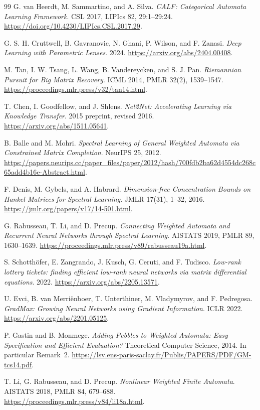 \documentclass[11pt]{article}
\theoremstyle{definition}
\theoremstyle{remark}
\begin{document}
\begin{thebibliography}{99}
G. van Heerdt, M. Sammartino, and A. Silva.
\emph{CALF: Categorical Automata Learning Framework}. CSL 2017,
LIPIcs 82, 29:1--29:24.
\url{https://doi.org/10.4230/LIPIcs.CSL.2017.29}.

G. S. H. Cruttwell, B. Gavranovic, N. Ghani, P. Wilson, and F. Zanasi.
\emph{Deep Learning with Parametric Lenses}. 2024.
\url{https://arxiv.org/abs/2404.00408}.

M. Tan, I. W. Tsang, L. Wang, B. Vandereycken, and S. J. Pan.
\emph{Riemannian Pursuit for Big Matrix Recovery}.
ICML 2014, PMLR 32(2), 1539--1547.
\url{https://proceedings.mlr.press/v32/tan14.html}.

T. Chen, I. Goodfellow, and J. Shlens.
\emph{Net2Net: Accelerating Learning via Knowledge Transfer}.
2015 preprint, revised 2016.
\url{https://arxiv.org/abs/1511.05641}.

B. Balle and M. Mohri.
\emph{Spectral Learning of General Weighted Automata via Constrained
Matrix Completion}. NeurIPS 25, 2012.
\url{https://papers.neurips.cc/paper_files/paper/2012/hash/700fdb2ba62d4554dc268c65add4b16e-Abstract.html}.

F. Denis, M. Gybels, and A. Habrard.
\emph{Dimension-free Concentration Bounds on Hankel Matrices for Spectral
Learning}. JMLR 17(31), 1--32, 2016.
\url{https://jmlr.org/papers/v17/14-501.html}.

G. Rabusseau, T. Li, and D. Precup.
\emph{Connecting Weighted Automata and Recurrent Neural Networks through
Spectral Learning}. AISTATS 2019, PMLR 89, 1630--1639.
\url{https://proceedings.mlr.press/v89/rabusseau19a.html}.

S. Schotth\"ofer, E. Zangrando, J. Kusch, G. Ceruti, and F. Tudisco.
\emph{Low-rank lottery tickets: finding efficient low-rank neural networks
via matrix differential equations}. 2022.
\url{https://arxiv.org/abs/2205.13571}.

U. Evci, B. van Merri\"enboer, T. Unterthiner, M. Vladymyrov, and F. Pedregosa.
\emph{GradMax: Growing Neural Networks using Gradient Information}.
ICLR 2022. \url{https://arxiv.org/abs/2201.05125}.

P. Gastin and B. Monmege.
\emph{Adding Pebbles to Weighted Automata: Easy Specification and Efficient
Evaluation?} Theoretical Computer Science, 2014. In particular Remark~2.
\url{https://lsv.ens-paris-saclay.fr/Publis/PAPERS/PDF/GM-tcs14.pdf}.

T. Li, G. Rabusseau, and D. Precup.
\emph{Nonlinear Weighted Finite Automata}.
AISTATS 2018, PMLR 84, 679--688.
\url{https://proceedings.mlr.press/v84/li18a.html}.

\end{thebibliography}
\end{document}
